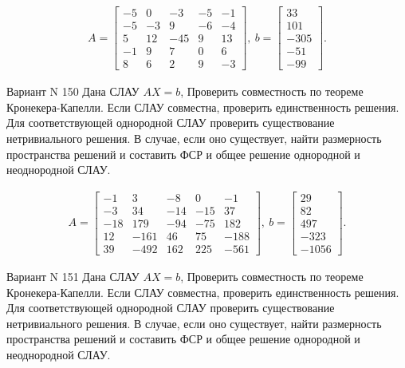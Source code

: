 \documentclass[11pt]{report}
\begin{document}
\begin{align*}
 A = \left[\begin{matrix}-5 & 0 & -3 & -5 & -1\\-5 & -3 & 9 & -6 & -4\\5 & 12 & -45 & 9 & 13\\-1 & 9 & 7 & 0 & 6\\8 & 6 & 2 & 9 & -3\end{matrix}\right],
\ b = \left[\begin{matrix}33\\101\\-305\\-51\\-99\end{matrix}\right]. 
 \end{align*}

Вариант N 150
Дана СЛАУ $AX = b$,
Проверить совместность по теореме Кронекера-Капелли. Если СЛАУ совместна, проверить единственность решения.
Для соответствующей однородной СЛАУ проверить существование нетривиального решения. В случае, если оно существует,
найти размерность пространства решений и составить ФСР и общее решение однородной  и неоднородной СЛАУ.


\begin{align*}
 A = \left[\begin{matrix}-1 & 3 & -8 & 0 & -1\\-3 & 34 & -14 & -15 & 37\\-18 & 179 & -94 & -75 & 182\\12 & -161 & 46 & 75 & -188\\39 & -492 & 162 & 225 & -561\end{matrix}\right],
\ b = \left[\begin{matrix}29\\82\\497\\-323\\-1056\end{matrix}\right]. 
 \end{align*}

Вариант N 151
Дана СЛАУ $AX = b$,
Проверить совместность по теореме Кронекера-Капелли. Если СЛАУ совместна, проверить единственность решения.
Для соответствующей однородной СЛАУ проверить существование нетривиального решения. В случае, если оно существует,
найти размерность пространства решений и составить ФСР и общее решение однородной  и неоднородной СЛАУ.
\end{document}
